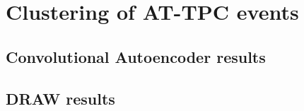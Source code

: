 \section{Clustering of AT-TPC events}

\subsection{Convolutional Autoencoder results}
\subsection{DRAW results}